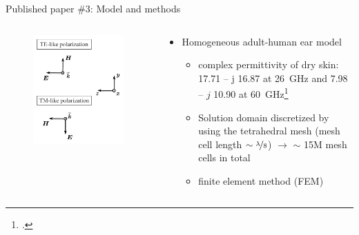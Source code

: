 \documentclass[xcolor=dvipsnames,10pt]{beamer}
\begin{document}
\begin{frame}{Published paper \#3: Model and methods}
\begin{columns}[c]
\begin{column}{0.4\textwidth}
\begin{onlyenv}
\begin{center}
\begin{figure}
                    \includegraphics[width=\textwidth]{artwork/IEEE-JERM-polarization.pdf}
                \end{figure}
                \end{center}
            \end{onlyenv}
        \end{column} 
        \begin{column}{0.6\textwidth}
            \begin{itemize}
                \item<1> Homogeneous adult-human ear model
                \begin{itemize}
                    \item complex permittivity of dry skin: \num{17.71} – j \num{16.87} at \SI{26}{\GHz} and \num{7.98} – $j$ \num{10.90} at \SI{60}{\GHz}\footcite{Gabriel1996Compilation}
                    \item Solution domain discretized by using the tetrahedral mesh (mesh cell length $\sim \nicefrac{\lambda}{8}$) $\rightarrow$ $\sim$ 15M mesh cells in total
                    \item finite element method (FEM)

\end{itemize}
\end{itemize}
\end{column}
\end{columns}
\end{frame}
\end{document}
